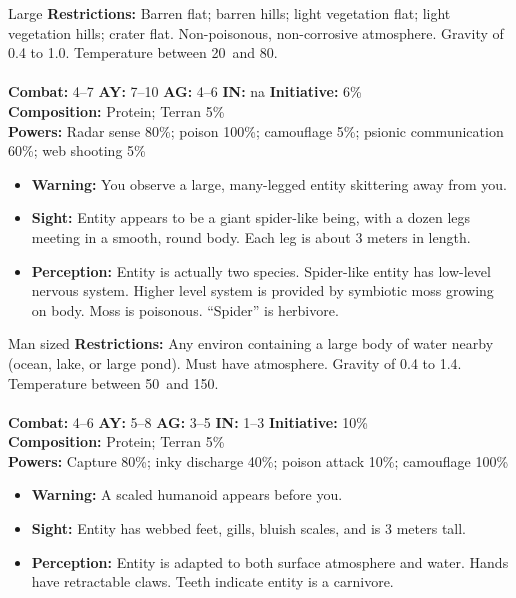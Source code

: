 \hrulefill

\begin{creature}{Large}
 \textbf{Restrictions:} Barren flat; barren hills; light vegetation flat; light vegetation hills; crater flat. Non-poisonous, 
non-corrosive atmosphere. Gravity of 0.4 to 1.0. Temperature between 20\textdegree\ and 80\textdegree. \\\\
\textbf{Combat:} 4--7 \textbf{AY:} 7--10 \textbf{AG:} 4--6 \textbf{IN:} na \textbf{Initiative:} 6\% \\
\textbf{Composition:} Protein; Terran 5\% \\
\textbf{Powers:} Radar sense 80\%; poison 100\%; camouflage 5\%; psionic communication 60\%; web shooting 5\% 
\begin{itemize}
\item \textbf{Warning:} You observe a large, many-legged entity skittering away from you. 
\item \textbf{Sight:} Entity appears to be a giant spider-like being, with a dozen legs meeting in a smooth, round body. Each leg is about 3 meters 
in length. 
\item \textbf{Perception:} Entity is actually two species. Spider-like entity has low-level nervous system. Higher level system is provided by 
symbiotic moss growing on body. Moss is poisonous. ``Spider'' is herbivore. 
\end{itemize}
\end{creature}

\hrulefill

\begin{creature}{Man sized}
\textbf{Restrictions:} Any environ containing a large body of water nearby (ocean, lake, or large pond). Must have atmosphere. Gravity of 0.4 
to 1.4. Temperature between 50\textdegree\ and 150\textdegree. \\\\
\textbf{Combat:} 4--6 \textbf{AY:} 5--8 \textbf{AG:} 3--5 \textbf{IN:} 1--3 \textbf{Initiative:} 10\% \\
\textbf{Composition:} Protein; Terran 5\% \\
\textbf{Powers:} Capture 80\%; inky discharge 40\%; poison attack 10\%; camouflage 100\% 
\begin{itemize}
\item \textbf{Warning:} A scaled humanoid appears before you. 
\item \textbf{Sight:} Entity has webbed feet, gills, bluish scales, and is 3 meters tall. 
\item \textbf{Perception:} Entity is adapted to both surface atmosphere and water. Hands have retractable claws. Teeth indicate entity is a 
carnivore. 
\end{itemize}
\end{creature}

